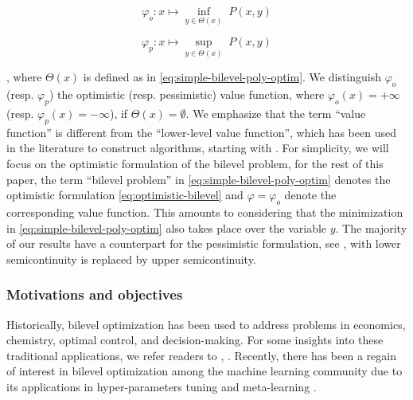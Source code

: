 \documentclass{article}
\newcommand*{\cX}{\mathcal{X}}
\newcommand*{\cY}{\mathcal{Y}}
\newcommand{\firstvar}{x}
\newcommand{\secondvar}{y}
\newcommand{\valoptim}{\varphi_o}
\newcommand{\valpessim}{\varphi_p}
\newcommand{\valbilevel}{\varphi}
\newcommand{\TL}[1]{\textcolor{red}{#1}}
\theoremstyle{plain}
\theoremstyle{definition}
\begin{document}
\noindent\begin{minipage}{.5\linewidth}
\begin{equation}
    \label{eq:optimistic-bilevel}
    \tag{BP-O}
    \valoptim\colon \firstvar \mapsto \inf_{\secondvar \in \Theta(x)} \; P(\firstvar,\secondvar)
\end{equation}
\end{minipage}%
\begin{minipage}{.5\linewidth}
\begin{equation}
    \label{eq:pessimistic-bilevel}
    \tag{BP-P}
    \valpessim \colon x \mapsto \sup_{\secondvar \in \Theta(\firstvar)} \; P(\firstvar,\secondvar)
\end{equation}
\end{minipage},
where $\Theta(\firstvar)$ is defined as in \eqref{eq:simple-bilevel-poly-optim}. %
We distinguish $\valoptim$ (resp. $\valpessim$) the optimistic (resp. pessimistic) value function, where $\valoptim(\firstvar) = + \infty$ (resp. $\valpessim(\firstvar) = - \infty$), if $\Theta(\firstvar) = \emptyset$.  We emphasize that the term ``value function'' is different from the ``lower-level value function'', which has been used in the literature to construct algorithms, starting with \cite{ye1995optimality}. For simplicity, we will focus on the optimistic formulation of the bilevel problem, for the rest of this paper, the term ``bilevel problem'' in \eqref{eq:simple-bilevel-poly-optim} denotes the optimistic formulation \eqref{eq:optimistic-bilevel} and $\valbilevel = \valoptim$ denote the corresponding value function. This amounts to considering that the minimization in \eqref{eq:simple-bilevel-poly-optim} also takes place over the variable $y$. The majority of our results have a counterpart for the pessimistic formulation, see , with lower semicontinuity is replaced by upper semicontinuity.

\subsubsection*{Motivations and objectives}
Historically, bilevel optimization has been used to address problems in economics, chemistry, optimal control, and decision-making. For some insights into these traditional applications, we refer readers to \cite[Chapter 1]{dempe2002foundations}, \cite{sinha2018review,cerulli:tel-03587548}. Recently, there has been a regain of interest in bilevel optimization among the machine learning community due to its applications in hyper-parameters tuning and meta-learning \cite{implicitMAML,Franceschi2018BilevelPF}. 
\end{document}
